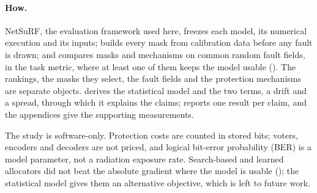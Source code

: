 \paragraph{How.} NetSuRF, the evaluation framework used here, freezes each model, its numerical execution and its inputs; builds every mask from calibration data before any fault is drawn; and compares masks and mechanisms on common random fault fields, in the task metric, where at least one of them keeps the model usable (). The rankings, the masks they select, the fault fields and the protection mechanisms are separate objects.  derives the statistical model and the two terms, a drift and a spread, through which it explains the claims;  reports one result per claim, and the appendices give the supporting measurements.

The study is software-only. Protection costs are counted in stored bits; voters, encoders and decoders are not priced, and logical bit-error probability (BER) is a model parameter, not a radiation exposure rate. Search-based and learned allocators did not beat the absolute gradient where the model is usable (); the statistical model gives them an alternative objective, which is left to future work.
